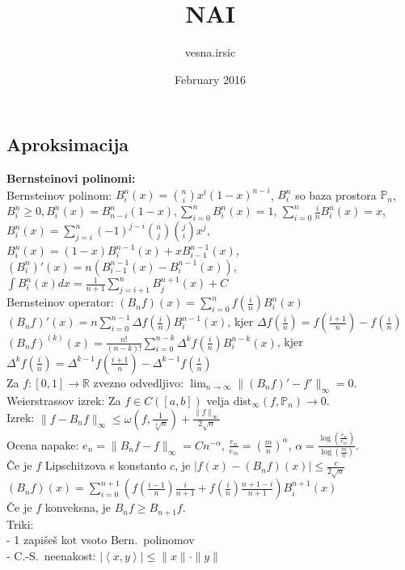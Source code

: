 \documentclass[a4paper,12pt]{article}
\title{NAI}
\author{vesna.irsic }
\date{February 2016}
\theoremstyle{definition}
\def\R{\mathbb{R}}
\def\P{\mathbb{P}}
\newcommand{\ls}{\left\langle}
\newcommand{\rs}{\right\rangle}
\begin{document}

\subsection*{Aproksimacija}
\textbf{Bernsteinovi polinomi:} \\
Bernsteinov polinom: $B_i^n(x) = \binom{n}{i} x^i (1-x)^{n-i}$, $B_i^n$ so baza prostora $\P_n$, $B_i^n \geq 0,
B_i^n(x) = B_{n-i}^n(1-x),
\sum_{i=0}^n B_i^n(x) = 1$,
$\sum_{i=0}^n \frac{i}{n} B_i^n(x) = x$,
$B_i^n(x) = \sum_{j=i}^n (-1)^{j-i} \binom{n}{j} \binom{j}{i} x^j$,
$B_i^n(x) = (1-x) B_i^{n-1}(x) + x B_{i-1}^{n-1}(x)$,
$(B_i^n)'(x) = n (B_{i-1}^{n-1}(x) - B_i^{n-1}(x))$,
$\int B_i^n(x) dx = \frac{1}{n+1} \sum_{j = i+1}^n B_j^{n+1}(x) + C$\\
Bernsteinov operator: $(B_nf)(x) = \sum_{i=0}^n f(\frac{i}{n}) B_i^n(x)$\\
$(B_nf)'(x) = n \sum_{i=0}^{n-1} \Delta f(\frac{i}{n}) B_i^{n-1}(x)$, kjer
$\Delta f(\frac{i}{n}) = f(\frac{i+1}{n}) - f(\frac{i}{n})$\\
$(B_nf)^{(k)}(x) = \frac{n!}{(n-k)!} \sum_{i=0}^{n-k} \Delta^kf(\frac{i}{n}) B_i^{n-k}(x)$,
kjer $\Delta^k f(\frac{i}{n}) = \Delta^{k-1} f(\frac{i+1}{n}) - \Delta^{k-1} f(\frac{i}{n})$\\
Za $f \colon [0,1] \to \R$ zvezno odvedljivo: $\lim_{n\to \infty} \|(B_nf)' - f'\|_{\infty} = 0$.\\
Weierstrassov izrek: Za $f \in C([a,b])$ velja $\text{dist}_{\infty} (f, \P_n) \to 0$.\\
Izrek: $\|f - B_n f\|_{\infty} \leq \omega(f, \frac{1}{\sqrt[4]{n}}) + \frac{\|f\|_{\infty}}{2 \sqrt{n}}$\\
Ocena napake: $e_n = \|B_nf - f\|_{\infty} = C n^{-\alpha}$, $\frac{e_n}{e_m} =
(\frac{m}{n})^{\alpha}$, $\alpha =
\frac{\log(\frac{e_n}{e_m})}{\log(\frac{m}{n})}$.\\
Če je $f$ Lipschitzova s konstanto $c$, je $|f(x) - (B_nf)(x)| \leq  \frac{c}{2 \sqrt{n}}$\\
$(B_nf)(x) = \sum_{i=0}^{n+1} (f(\frac{i-1}{n}) \frac{i}{n+1} + f(\frac{i}{n}) \frac{n+1-i}{n+1}) B_i^{n+1}(x)$\\
Če je $f$ konveksna, je $B_nf \geq B_{n+1}f$.\\
Triki:\\
- 1 zapišeš kot vsoto Bern.\ polinomov\\
- C.-S.\ neenakost: $|\ls x,y\rs| \leq \|x\| \cdot \|y\|$
\end{document}
